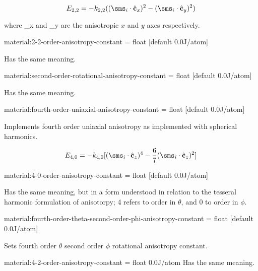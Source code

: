 \begin{equation*}
E_{2,2} = - k_{2,2} ( ( \sms_i \cdot \hat{\mathbf{c}}_x )^2 - ( \sms_i \cdot \hat{\mathbf{c}}_y )^2 )
\end{equation*}

\noindent where _x and _y are the anisotropic $x$ and $y$ axes respectively.

{\zicf material:2-2-order-anisotropy-constant = float [default 0.0\newline J/atom]} Has the same meaning.

{\zicf material:second-order-rotational-anisotropy-constant = float [default 0.0\newline J/atom]} Has the same meaning.

{\zicf material:fourth-order-uniaxial-anisotropy-constant = float [default 0.0\newline J/atom]} Implements fourth order uniaxial anisotropy as implemented with spherical harmonics.

\begin{equation*}
  E_{4,0} = - k_{4,0} [ ( \sms_i \cdot \hat{\mathbf{c}}_z )^4 - \frac{6}{7} ( \sms_i \cdot \hat{\mathbf{c}}_z )^2 ]
\end{equation*}

{\zicf material:4-0-order-anisotropy-constant = float [default 0.0\newline J/atom]} Has the same meaning, but in a form understood in relation to the tesseral harmonic formulation of anisotorpy; 4 refers to order in $\theta$, and 0 to order in $\phi$.

{\zicf material:fourth-order-theta-second-order-phi-anisotropy-constant = float [default 0.0\newline J/atom]} Sets fourth order $\theta$ second order $\phi$ rotational anisotropy constant.

{\zicf material:4-2-order-anisotropy-constant = float 0.0\newline J/atom} Has the same meaning.

